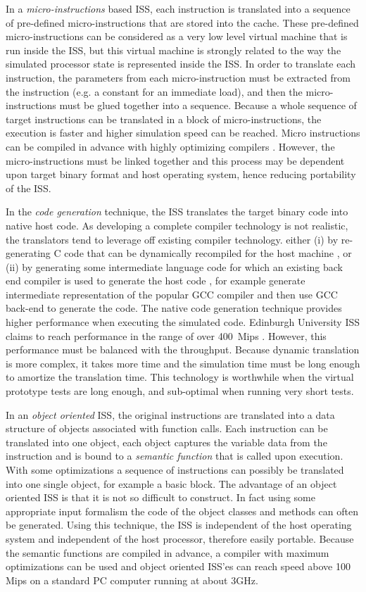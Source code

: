 \documentclass{llncs}
\begin{document}
In a \textit{micro-instructions} based ISS, each instruction is
translated into a sequence of pre-defined micro-instructions that are
stored into the cache. These pre-defined micro-instructions can be
considered as a very low level virtual machine that is run inside the
ISS, but this virtual machine is strongly related to the way the
simulated processor state is represented inside the ISS. In order to
translate each instruction, the parameters from each micro-instruction
must be extracted from the instruction (e.g. a constant for an
immediate load), and then the micro-instructions must be glued
together into a sequence. Because a whole sequence of target
instructions can be translated in a block of micro-instructions, the
execution is faster and higher simulation speed can be reached. Micro
instructions can be compiled in advance with highly optimizing
compilers \cite{qemu}. However, the micro-instructions must be linked
together and this process may be dependent upon target binary format
and host operating system, hence reducing portability of the ISS.

In the \textit{code generation} technique, the ISS translates the
target binary code into native host code.  As developing a complete
compiler technology is not realistic, the translators tend to leverage
off existing compiler technology.  either (i) by re-generating C code
that can be dynamically recompiled for the host machine
\cite{qin-zhu}, or (ii) by generating some intermediate language code
for which an existing back end compiler is used to generate the host
code \cite{dynamic-IL}, for example generate intermediate
representation of the popular GCC compiler and then use GCC back-end
to generate the code. The native code generation technique provides
higher performance when executing the simulated code. Edinburgh
University ISS claims to reach performance in the range of over
400~Mips \cite{jones-topham}. However, this performance must be
balanced with the throughput. Because dynamic translation is more
complex, it takes more time and the simulation time must be long
enough to amortize the translation time. This technology is worthwhile
when the virtual prototype tests are long enough, and sub-optimal when
running very short tests.

In an \textit{object oriented} ISS, the original instructions are
translated into a data structure of objects associated with function
calls. Each instruction can be translated into one object, each object
captures the variable data from the instruction and is bound to a
\textit{semantic function} that is called upon execution. With some
optimizations a sequence of instructions can possibly be translated
into one single object, for example a basic block. The advantage of an
object oriented ISS is that it is not so difficult to construct. In
fact using some appropriate input formalism the code of the object
classes and methods can often be generated. Using this technique, the
ISS is independent of the host operating system and independent of the
host processor, therefore easily portable. Because the semantic
functions are compiled in advance, a compiler with maximum
optimizations can be used and object oriented ISS'es can reach speed
above 100 Mips on a standard PC computer running at
about 3GHz.
\end{document}
